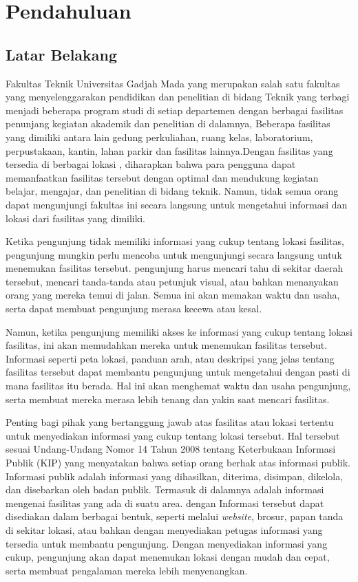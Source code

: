 \chapter{Pendahuluan}

\section{Latar Belakang}



Fakultas Teknik Universitas Gadjah Mada yang merupakan salah satu fakultas yang menyelenggarakan pendidikan 
dan penelitian di bidang Teknik yang terbagi menjadi beberapa program studi di setiap departemen dengan
berbagai fasilitas penunjang kegiatan akademik dan penelitian di dalamnya\cite{whatisftugm}, Beberapa fasilitas yang
dimiliki antara lain gedung perkuliahan, ruang kelas, laboratorium, perpustakaan, kantin, lahan parkir
dan fasilitas lainnya.Dengan fasilitas yang tersedia di berbagai lokasi , 
diharapkan bahwa para pengguna dapat memanfaatkan fasilitas tersebut dengan optimal dan mendukung kegiatan belajar, mengajar, dan penelitian di bidang teknik.
Namun, tidak semua orang dapat mengunjungi fakultas ini secara langsung untuk
mengetahui informasi dan lokasi dari fasilitas yang dimiliki\cite{whyisnotvisited}.

Ketika pengunjung tidak memiliki informasi yang cukup tentang lokasi fasilitas, pengunjung mungkin perlu mencoba
untuk mengunjungi secara langsung untuk menemukan fasilitas tersebut. pengunjung harus mencari tahu 
di sekitar daerah tersebut, mencari tanda-tanda atau petunjuk visual, atau bahkan menanyakan 
orang yang mereka temui di jalan. Semua ini akan memakan waktu dan usaha, serta dapat membuat
pengunjung merasa kecewa atau kesal.

Namun, ketika pengunjung memiliki akses ke informasi yang cukup tentang lokasi fasilitas, 
ini akan memudahkan mereka untuk menemukan fasilitas tersebut. Informasi seperti peta lokasi,
panduan arah, atau deskripsi yang jelas tentang fasilitas tersebut dapat membantu pengunjung 
untuk mengetahui dengan pasti di mana fasilitas itu berada. Hal ini akan menghemat waktu dan
usaha pengunjung, serta membuat mereka merasa lebih tenang dan yakin saat mencari fasilitas.

Penting bagi pihak yang bertanggung jawab atas fasilitas atau lokasi tertentu 
untuk menyediakan informasi yang cukup tentang lokasi tersebut. Hal tersebut sesuai 
Undang-Undang Nomor 14 Tahun 2008 tentang Keterbukaan Informasi Publik (KIP) yang menyatakan bahwa
setiap orang berhak atas informasi publik. Informasi publik adalah informasi yang dihasilkan,
diterima, disimpan, dikelola, dan disebarkan oleh badan publik. Termasuk di dalamnya adalah
informasi mengenai fasilitas yang ada di suatu area\cite{uuno142008}.
dengan Informasi tersebut dapat 
disediakan dalam berbagai bentuk, seperti melalui \emph{website}, brosur, papan tanda di sekitar
lokasi, atau bahkan dengan menyediakan petugas informasi yang tersedia untuk membantu
pengunjung. Dengan menyediakan informasi yang cukup, pengunjung akan dapat menemukan 
  lokasi dengan mudah dan cepat, serta membuat pengalaman mereka lebih menyenangkan.


